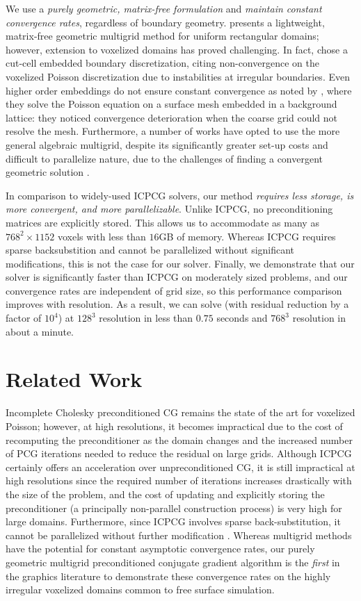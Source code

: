 We use a \emph{purely geometric, matrix-free formulation} and \emph{maintain constant convergence rates}, regardless of boundary geometry.  \cite{BWR05} presents a lightweight, matrix-free geometric multigrid method for uniform rectangular domains; however, extension to voxelized domains has proved challenging.  In fact, \cite{HMB05} chose a cut-cell embedded boundary discretization, citing non-convergence on the voxelized Poisson discretization due to instabilities at irregular boundaries.  Even higher order embeddings do not ensure constant convergence as noted by \cite{CLB09}, where they solve the Poisson equation on a surface mesh embedded in a background lattice: they noticed convergence deterioration when the coarse grid could not resolve the mesh.  Furthermore, a number of works have opted to use the more general algebraic multigrid, despite its significantly greater set-up costs and difficult to parallelize nature\cite{trottenberg:2001:multigrid}, due to the challenges of finding a convergent geometric solution \cite{CNF07, CGR04, PM04}.

In comparison to widely-used ICPCG solvers, our method \emph{requires less storage, is more convergent, and more parallelizable}.  Unlike ICPCG, no preconditioning matrices are explicitly stored.  This allows us to accommodate as many as $768^2\!\times\!1152$ voxels with less than $16$GB of memory. Whereas ICPCG requires sparse backsubstition and cannot be parallelized without significant modifications, this is not the case for our solver.  Finally, we demonstrate that our solver is significantly faster than ICPCG on moderately sized problems, and our convergence rates are independent of grid size, so this performance comparison improves with resolution.  As a result, we can solve (with residual reduction by a factor of $10^4$) at $128^3$ resolution in less than $0.75$ seconds and $768^3$ resolution in about a minute.

\section{Related Work}

Incomplete Cholesky preconditioned CG remains the state of the art for voxelized Poisson; however, at high resolutions, it becomes impractical due to the cost of recomputing the preconditioner as the domain changes and the increased number of PCG iterations needed to reduce the residual on large grids.  
Although ICPCG certainly offers an acceleration over unpreconditioned CG, it is still impractical at high resolutions since the required number of iterations increases drastically with the size of the problem, and the cost of updating and explicitly storing the preconditioner (a principally non-parallel construction process) 
is very high for large domains.  Furthermore, since ICPCG involves sparse back-substitution, it cannot be parallelized without further modification \cite{Hughes:2007:physicalsimulation}.
Whereas multigrid methods have the potential for constant asymptotic convergence rates, our purely geometric multigrid preconditioned conjugate gradient algorithm is the \emph{first} in the graphics literature to demonstrate these convergence rates on the highly irregular voxelized domains common to free surface simulation.

